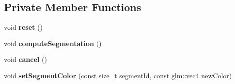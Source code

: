 \subsection*{Private Member Functions}
\begin{DoxyCompactItemize}
\item 
\mbox{\label{classpepr3d_1_1_segmentation_a753243eb08623cc0e4e742b9b80d6fe1}} 
void {\bfseries reset} ()
\item 
\mbox{\label{classpepr3d_1_1_segmentation_ad2c81addb59679af3aad6753bfb3e187}} 
void {\bfseries compute\+Segmentation} ()
\item 
\mbox{\label{classpepr3d_1_1_segmentation_a2ee801c12891b63645c44460692351f4}} 
void {\bfseries cancel} ()
\item 
\mbox{\label{classpepr3d_1_1_segmentation_aeed45ad861dcf859e90b9b5d317655f1}} 
void {\bfseries set\+Segment\+Color} (const size\+\_\+t segment\+Id, const glm\+::vec4 new\+Color)
\end{DoxyCompactItemize}
